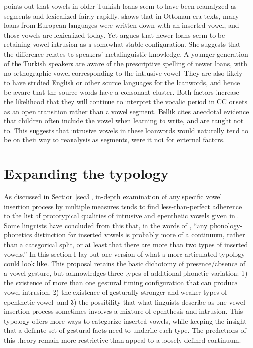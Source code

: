 \documentclass[output=paper,colorlinks,citecolor=brown]{langscibook}
\begin{document}
\citet{Bellik2019a} points out that vowels in older Turkish loans seem to have been reanalyzed as segments and lexicalized fairly rapidly. \citet{walter2018} shows that in Ottoman-era texts, many loans from European languages were written down with an inserted vowel, and those vowels are lexicalized today. Yet \citet{Bellik2019a} argues that newer loans seem to be retaining vowel intrusion as a somewhat stable configuration. She suggests that the difference relates to speakers’ metalinguistic knowledge. A younger generation of the Turkish speakers are aware of the prescriptive spelling of newer loans, with no orthographic vowel corresponding to the intrusive vowel. They are also likely to have studied English or other source languages for the loanwords, and hence be aware that the source words have a consonant cluster. Both factors increase the likelihood that they will continue to interpret the vocalic period in CC onsets as an open transition rather than a vowel segment. Bellik cites anecdotal evidence that children often include the vowel when learning to write, and are taught not to. This suggests that intrusive vowels in these loanwords would naturally tend to be on their way to reanalysis as segments, were it not for external factors.

\section{Expanding the typology}\label{sec4}

As discussed in Section \ref{sec3}, in-depth examination of any specific vowel insertion process by multiple measures tends to find less-than-perfect adherence to the list of prototypical qualities of intrusive and epenthetic vowels given in . Some linguists have concluded from this that, in the words of \citet{hammond2014vowel}, “any phonology-phonetics distinction for inserted vowels is probably more of a continuum, rather than a categorical split, or at least that there are more than two types of inserted vowels.” In this section I lay out one version of what a more articulated typology could look like. This proposal retains the basic dichotomy of presence\slash absence of a vowel gesture, but acknowledges three types of additional phonetic variation: 1) the existence of more than one gestural timing configuration that can produce vowel intrusion, 2) the existence of gesturally stronger and weaker types of epenthetic vowel, and 3) the possibility that what linguists describe as one vowel insertion process sometimes involves a mixture of epenthesis and intrusion. This typology offers more ways to categorize inserted vowels, while keeping the insight that a definite set of gestural facts need to underlie each type. The predictions of this theory remain more restrictive than appeal to a loosely-defined continuum.
\end{document}
